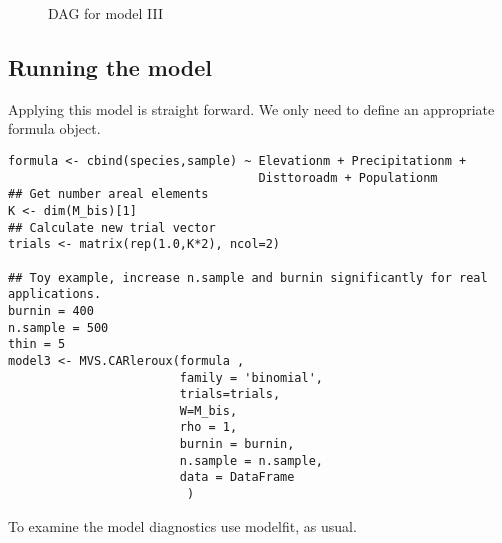 \documentclass[11pt]{article}
\begin{document}
\begin{figure}
\caption{DAG for model III}
\end{figure}

\subsection{Running the model}
\label{sec:orgded8e53}
Applying this model is straight forward. We only need to define an appropriate formula object.

\begin{verbatim}
formula <- cbind(species,sample) ~ Elevationm + Precipitationm +
                                   Disttoroadm + Populationm
## Get number areal elements
K <- dim(M_bis)[1]
## Calculate new trial vector
trials <- matrix(rep(1.0,K*2), ncol=2)

## Toy example, increase n.sample and burnin significantly for real applications.
burnin = 400
n.sample = 500
thin = 5
model3 <- MVS.CARleroux(formula ,
                        family = 'binomial',
                        trials=trials,
                        W=M_bis,
                        rho = 1,
                        burnin = burnin,
                        n.sample = n.sample,
                        data = DataFrame
                         )

\end{verbatim}

To examine the model diagnostics use modelfit, as usual.
\end{document}
